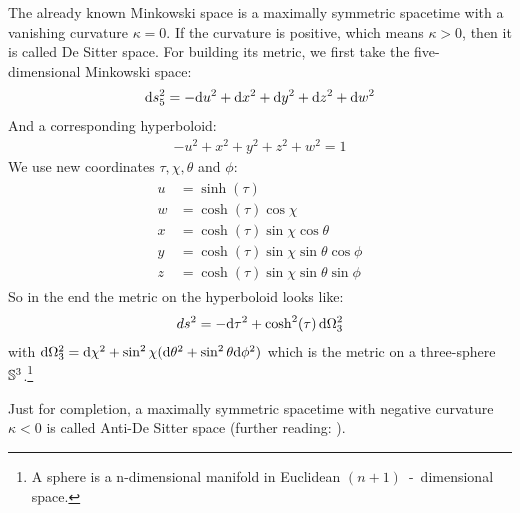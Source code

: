 	The already known Minkowski space is a maximally symmetric spacetime with a vanishing curvature $\kappa = 0$. If the curvature is positive, which means $\kappa > 0$, then it is called De Sitter space. For building its metric, we first take the five-dimensional Minkowski space:
		\begin{align}
			\mathrm{d} s^2_5 = -\mathrm{d} u^2 + \mathrm{d} x^2 + \mathrm{d} y^2 + \mathrm{d} z^2 + \mathrm{d} w^2
		\end{align}
	And a corresponding hyperboloid:
		\begin{align}
			-u^2 + x^2 + y^2 + z^2 + w^2 = 1
		\end{align}
	We use new coordinates $\tau, \chi, \theta$ and $\phi$:
		\begin{align}
			\begin{split}
			u &= \sinh (\tau) \\
			w &= \cosh (\tau) \cos \chi \\
			x &= \cosh (\tau) \sin \chi \cos \theta \\
			y &= \cosh (\tau) \sin \chi \sin \theta \cos \phi \\
			z &= \cosh (\tau) \sin \chi \sin \theta \sin \phi
			\end{split}
		\end{align}
	So in the end the metric on the hyperboloid looks like:
		\begin{align} \label{de-sitter}
			ds^2 = -\mathrm{d} \tau^2 + \cosh^2(\tau) \, \mathrm{d} \Omega^2_3 
		\end{align}
	with $\mathrm{d} \Omega_3^2 = \mathrm{d} \chi^2 + \sin^2 \chi (\mathrm{d} \theta^2 + \sin^2 \theta \mathrm{d} \phi^2)$
	which is the metric on a three-sphere $\mathbb{S}^3$.\footnote{A sphere is a n-dimensional manifold in Euclidean $(n+1)$~-~dimensional space.}
	
	Just for completion, a maximally symmetric spacetime with negative curvature $\kappa < 0$ is called Anti-De Sitter space (further reading: \cite{SpacetimeCarroll}).